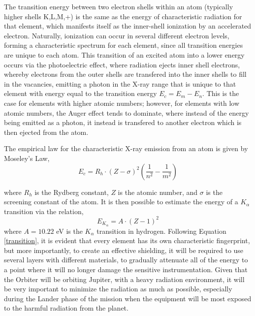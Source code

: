 The transition energy between two electron shells within an atom (typically higher shells K,L,M,+) is the same as the energy of characteristic radiation for that element, which manifests itself as the inner-shell ionization by an accelerated electron. Naturally, ionization can occur in several different electron levels, forming a characteristic spectrum for each element, since all transition energies are unique to each atom. This transition of an excited atom into a lower energy occurs via the photoelectric effect, where radiation ejects inner shell electrons, whereby electrons from the outer shells are transfered into the inner shells to fill in the vacancies, emitting a photon in the X-ray range that is unique to that element with energy equal to the transition energy $E_c = E_m - E_n$. This is the case for elements with higher atomic numbers; however, for elements with low atomic numbers, the Auger effect tends to dominate, where instead of the energy being emitted as a photon, it instead is transfered to another electron which is then ejected from the atom.

The empirical law for the characteristic X-ray emission from an atom is given by Moseley's Law,\\
\begin{equation}
E_c= R_h \cdot (Z-\sigma)^2 \left(\frac{1}{n^2} - \frac{1}{m^2}\right)\label{moseley:eq}
\end{equation}

where $R_h$ is the Rydberg constant, $Z$ is the atomic number, and $\sigma$ is the screening constant of the atom. It is then possible to estimate the energy of a $K_\alpha$ transition via the relation,\\
\begin{equation}
E_{K_\alpha} = A \cdot (Z-1)^2 \label{transition}
\end{equation}
where $A = 10.22$ eV is the $K_\alpha$ transition in hydrogen. Following Equation \ref{transition}, it is evident that every element has its own characteristic fingerprint, but more importantly, to create an effective shielding, it will be required to use several layers with different materials, to gradually attenuate all of the energy to a point where it will no longer damage the sensitive instrumentation. Given that the Orbiter will be orbiting Jupiter, with a heavy radiation environment, it will be very important to minimize the radiation as much as possible, especially during the Lander phase of the mission when the equipment will be most exposed to the harmful radiation from the planet.

